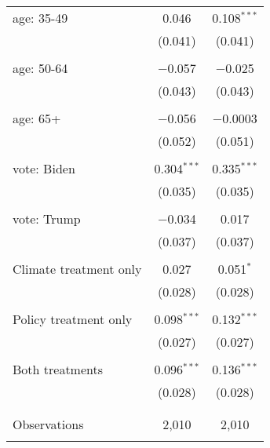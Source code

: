 \begin{tabular}{@{\extracolsep{5pt}}lcc}
 age: 35-49 & 0.046 & 0.108$^{***}$ \\ 
  & (0.041) & (0.041) \\ 
  & & \\ 
 age: 50-64 & $-$0.057 & $-$0.025 \\ 
  & (0.043) & (0.043) \\ 
  & & \\ 
 age: 65+ & $-$0.056 & $-$0.0003 \\ 
  & (0.052) & (0.051) \\ 
  & & \\ 
 vote: Biden & 0.304$^{***}$ & 0.335$^{***}$ \\ 
  & (0.035) & (0.035) \\ 
  & & \\ 
 vote: Trump & $-$0.034 & 0.017 \\ 
  & (0.037) & (0.037) \\ 
  & & \\ 
 Climate treatment only & 0.027 & 0.051$^{*}$ \\ 
  & (0.028) & (0.028) \\ 
  & & \\ 
 Policy treatment only & 0.098$^{***}$ & 0.132$^{***}$ \\ 
  & (0.027) & (0.027) \\ 
  & & \\ 
 Both treatments & 0.096$^{***}$ & 0.136$^{***}$ \\ 
  & (0.028) & (0.028) \\ 
  & & \\ 
\hline \\[-1.8ex] 

Observations & 2,010 & 2,010 \\ 
\hline 
\hline \\[-1.8ex] 
\end{tabular} 